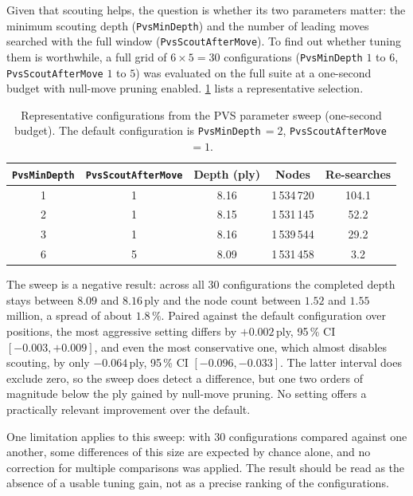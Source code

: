 Given that scouting helps, the question is whether its two parameters matter: the
minimum scouting depth (\texttt{PvsMinDepth}) and the number of leading moves
searched with the full window (\texttt{PvsScoutAfterMove}). To find out whether
tuning them is worthwhile, a full grid of $6 \times 5 = 30$ configurations
(\texttt{PvsMinDepth} $1$ to $6$, \texttt{PvsScoutAfterMove} $1$ to $5$) was
evaluated on the full suite at a one-second budget with null-move pruning
enabled. \cref{tab:pvs_sweep} lists a representative selection.

\begin{table}[ht]
\centering
\begin{tabular}{@{}ccccc@{}}
\toprule
\texttt{PvsMinDepth} & \texttt{PvsScoutAfterMove} & Depth (ply) & Nodes & Re-searches \\ \midrule
1 & 1 & 8.16 & 1\,534\,720 & 104.1 \\
2 & 1 & 8.15 & 1\,531\,145 & 52.2 \\
3 & 1 & 8.16 & 1\,539\,544 & 29.2 \\
6 & 5 & 8.09 & 1\,531\,458 & 3.2 \\ \bottomrule
\end{tabular}
\caption{Representative configurations from the PVS parameter sweep (one-second
budget). The default configuration is \texttt{PvsMinDepth}\,$=2$,
\texttt{PvsScoutAfterMove}\,$=1$.}
\label{tab:pvs_sweep}
\end{table}

The sweep is a negative result: across all 30 configurations the completed depth
stays between $8.09$ and $8.16$\,ply and the node count between $1.52$ and $1.55$
million, a spread of about $1.8\,\%$. Paired against the default configuration
over positions, the most aggressive setting differs by $+0.002$\,ply,
95\,\% CI $[-0.003, +0.009]$, and even the most conservative one, which almost
disables scouting, by only $-0.064$\,ply, 95\,\% CI $[-0.096, -0.033]$. The
latter interval does exclude zero, so the sweep does detect a difference, but one
two orders of magnitude below the ply gained by null-move pruning. No setting
offers a practically relevant improvement over the default.

One limitation applies to this sweep: with 30 configurations compared against one
another, some differences of this size are expected by chance alone, and no
correction for multiple comparisons was applied. The result should be read as the
absence of a usable tuning gain, not as a precise ranking of the configurations.

